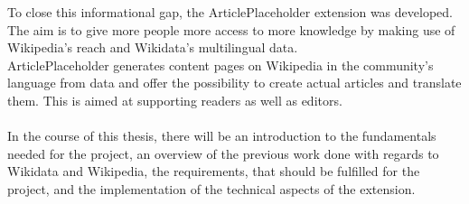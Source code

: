 To close this informational gap, the ArticlePlaceholder extension was developed. The aim is to give more people more access to more knowledge by making use of Wikipedia’s reach and Wikidata’s multilingual data. \\
ArticlePlaceholder generates content pages on Wikipedia in the community's language from data and offer the possibility to create actual articles and translate them. This is aimed at supporting readers as well as editors. \\
\\
In the course of this thesis, there will be an introduction to the fundamentals needed for the project, an overview of the previous work done with regards to Wikidata and Wikipedia, the requirements, that should be fulfilled for the project, and the implementation of the technical aspects of the extension. 